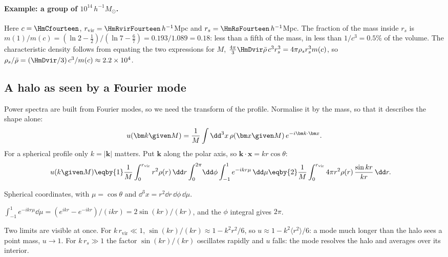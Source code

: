 \paragraph{Example: a group of $10^{14}\,h^{-1}M_\odot$.}
Here $c=\HmCfourteen$, $r_{\mathrm{vir}}=\HmRvirFourteen\,h^{-1}$Mpc and
$r_s=\HmRsFourteen\,h^{-1}$Mpc. The fraction of the mass inside $r_s$ is
$m(1)/m(c)=(\ln2-\frac12)/(\ln7-\frac67)=0.193/1.089=0.18$: less than a fifth of
the mass, in less than $1/c^3=0.5\%$ of the volume. The characteristic density
follows from equating the two expressions for $M$,
$\frac{4\pi}{3}\HmDvir\bar\rho\,c^3r_s^3=4\pi\rho_sr_s^3m(c)$, so
$\rho_s/\bar\rho=(\HmDvir/3)\,c^3/m(c)\approx2.2\times10^4$.

\subsection{A halo as seen by a Fourier mode}
\label{11b:sec:ukm}

Power spectra are built from Fourier modes, so we need the transform of the
profile. Normalise it by the mass, so that it describes the shape alone:
\begin{equation}
  u(\bm k\given M)=\frac1M\int\dd^3x\,\rho(\bm x\given M)\,e^{-i\bm k\cdot\bm x}.
  \label{11b:eq:u-def}
\end{equation}
For a spherical profile only $k=|\bm k|$ matters. Put $\bm k$ along the polar axis,
so $\bm k\cdot\bm x=kr\cos\theta$:
\begin{align}
  u(k\given M)
  &\eqby{1}\frac1M\int_0^{r_{\mathrm{vir}}}r^2\rho(r)\,\dd r
     \int_0^{2\pi}\!\dd\phi\int_{-1}^{1}e^{-ikr\mu}\,\dd\mu
   \eqby{2}\frac1M\int_0^{r_{\mathrm{vir}}}4\pi r^2\rho(r)\,
     \frac{\sin kr}{kr}\,\dd r .
  \label{11b:eq:u-radial}
\end{align}
\begin{explain}
  \item Spherical coordinates, with $\mu=\cos\theta$ and
        $\dd^3x=r^2\dd r\,\dd\phi\,\dd\mu$.
  \item $\int_{-1}^1e^{-ikr\mu}\dd\mu=(e^{ikr}-e^{-ikr})/(ikr)=2\sin(kr)/(kr)$,
        and the $\phi$ integral gives $2\pi$.
\end{explain}
Two limits are visible at once. For $k\,r_{\mathrm{vir}}\ll1$,
$\sin(kr)/(kr)\approx1-k^2r^2/6$, so $u\approx1-k^2\langle r^2\rangle/6$: a mode much
longer than the halo sees a point mass, $u\to1$. For $k\,r_s\gg1$ the factor
$\sin(kr)/(kr)$ oscillates rapidly and $u$ falls: the mode resolves the halo and
averages over its interior.

